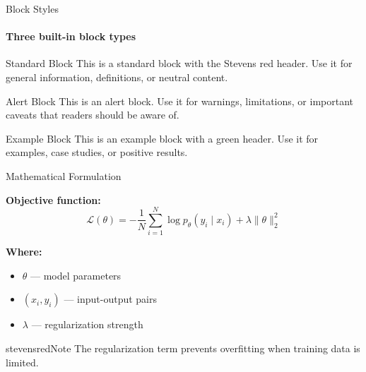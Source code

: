 \begin{frame}{Block Styles}
\framesubtitle{Three built-in block types}

\begin{block}{Standard Block}
This is a standard block with the Stevens red header. Use it for general information, definitions, or neutral content.
\end{block}

\vspace{0.3em}

\begin{alertblock}{Alert Block}
This is an alert block. Use it for warnings, limitations, or important caveats that readers should be aware of.
\end{alertblock}

\vspace{0.3em}

\begin{exampleblock}{Example Block}
This is an example block with a green header. Use it for examples, case studies, or positive results.
\end{exampleblock}
\end{frame}

\begin{frame}{Mathematical Formulation}

\textbf{Objective function:}
\[
\mathcal{L}(\theta) = -\frac{1}{N}\sum_{i=1}^{N} \log p_\theta(y_i \mid x_i) + \lambda \|\theta\|_2^2
\]

\vspace{0.3em}
\textbf{Where:}
\begin{itemize}
    \item $\theta$ --- model parameters
    \item $(x_i, y_i)$ --- input-output pairs
    \item $\lambda$ --- regularization strength
\end{itemize}

\vspace{0.5em}

\begin{colorblock}[white]{stevensred}{Note}
The regularization term prevents overfitting when training data is limited.
\end{colorblock}

\end{frame}
